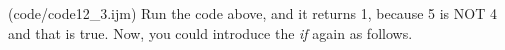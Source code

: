 (code/code12_3.ijm)
Run the code above, and it returns 1, because 5 is NOT 4 and that is true. Now,
you could introduce the \textit{if} again as follows.